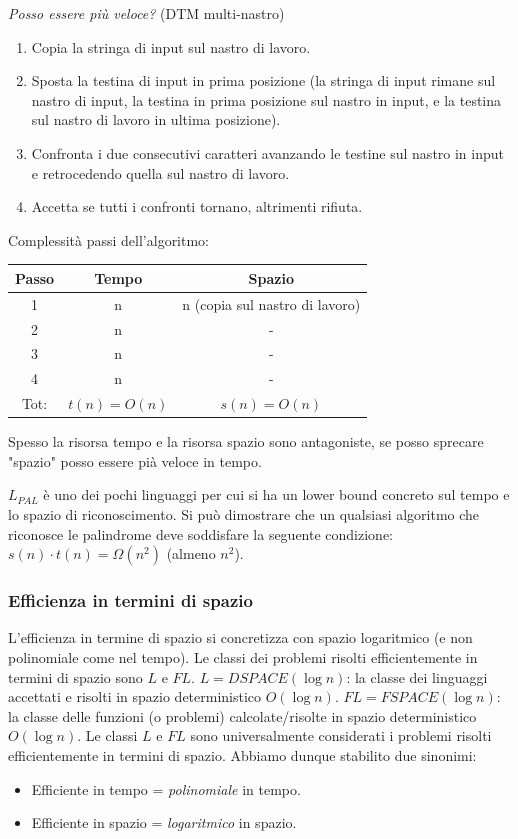 \documentclass{article}
\begin{document}
\noindent\textit{Posso essere più veloce?} (DTM multi-nastro)
\begin{enumerate}
    \item Copia la stringa di input sul nastro di lavoro.
    \item Sposta la testina di input in prima posizione (la stringa di input rimane
    sul nastro di input, la testina in prima posizione sul nastro in input, e la testina
    sul nastro di lavoro in ultima posizione).
    \item Confronta i due consecutivi caratteri avanzando le testine sul nastro in input
    e retrocedendo quella sul nastro di lavoro.
    \item Accetta se tutti i confronti tornano, altrimenti rifiuta.
\end{enumerate}
Complessità passi dell'algoritmo:
\begin{center}
    \begin{tabular}{c c c}
        Passo&Tempo & Spazio\\
        \midrule
        1&n & n (copia sul nastro di lavoro)\\
        2&n&-\\
        3&n&-\\
        4&n&-\\
        \midrule
        Tot:&$t(n)=O(n)$&$s(n)=O(n)$
\end{tabular}
\end{center}
Spesso la risorsa tempo e la risorsa spazio sono antagoniste, se posso sprecare "spazio"
posso essere pià veloce in tempo.

$L_{PAL}$ è uno dei pochi linguaggi per cui si ha un lower bound concreto sul
tempo e lo spazio di riconoscimento. Si può dimostrare che un qualsiasi algoritmo
che riconosce le palindrome deve soddisfare la
seguente condizione: $s(n)\cdot t(n)=\Omega(n^2)$ (almeno $n^2$).

\subsubsection{Efficienza in termini di spazio}
L'efficienza in termine di spazio si concretizza con spazio logaritmico (e non polinomiale
come nel tempo). Le classi dei problemi risolti efficientemente in termini di spazio sono $L$
e $FL$.
$L=DSPACE(\log n)$: la classe dei linguaggi accettati e risolti in spazio deterministico $O(\log n)$.
$FL=FSPACE(\log n)$: la classe delle funzioni (o problemi) calcolate/risolte in spazio deterministico
$O(\log n)$.
Le classi $L$ e $FL$ sono universalmente considerati i problemi risolti efficientemente in termini
di spazio. Abbiamo dunque stabilito due sinonimi:
\begin{itemize}
    \item Efficiente in tempo = \textit{polinomiale} in tempo.
    \item Efficiente in spazio = \textit{logaritmico} in spazio.
\end{itemize}
\end{document}
